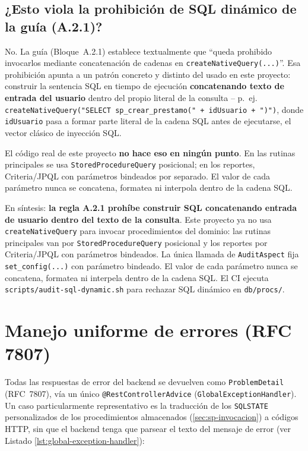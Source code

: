 \subsection*{¿Esto viola la prohibición de SQL dinámico de la guía (A.2.1)?}

No. La guía (Bloque~A.2.1) establece textualmente que ``queda prohibido
invocarlos mediante concatenación de cadenas en
\texttt{createNativeQuery(...)}''. Esa prohibición apunta a un patrón
concreto y distinto del usado en este proyecto: construir la sentencia
SQL en tiempo de ejecución \textbf{concatenando texto de entrada del
usuario} dentro del propio literal de la consulta -- p.~ej.
\texttt{createNativeQuery("SELECT sp\_crear\_prestamo(" + idUsuario +
")")}, donde \texttt{idUsuario} pasa a formar parte literal de la
cadena SQL antes de ejecutarse, el vector clásico de inyección SQL.

El código real de este proyecto \textbf{no hace eso en ningún punto}. En
las rutinas principales se usa \texttt{StoredProcedureQuery} posicional;
en los reportes, Criteria/JPQL con parámetros bindeados por separado. El
valor de cada parámetro nunca se concatena, formatea ni interpola dentro
de la cadena SQL.

En síntesis: \textbf{la regla A.2.1 prohíbe construir SQL concatenando
entrada de usuario dentro del texto de la consulta}. Este proyecto ya no
usa \texttt{createNativeQuery} para invocar procedimientos del dominio:
las rutinas principales van por \texttt{StoredProcedureQuery} posicional y
los reportes por Criteria/JPQL con parámetros bindeados. La única llamada
de \texttt{AuditAspect} fija \texttt{set\_config(...)} con parámetro
bindeado. El valor de cada parámetro nunca se concatena, formatea ni
interpela dentro de la cadena SQL.
El CI ejecuta \texttt{scripts/audit-sql-dynamic.sh} para rechazar SQL
dinámico en \texttt{db/procs/}.

\section{Manejo uniforme de errores (RFC 7807)}

Todas las respuestas de error del backend se devuelven como
\texttt{ProblemDetail} (RFC~7807), vía un único
\texttt{@RestControllerAdvice} (\texttt{GlobalExceptionHandler}). Un
caso particularmente representativo es la traducción de los
\texttt{SQLSTATE} personalizados de los procedimientos almacenados
(\autoref{sec:sp-invocacion}) a códigos HTTP, sin que el backend tenga
que parsear el texto del mensaje de error (ver Listado \ref{lst:global-exception-handler}):

